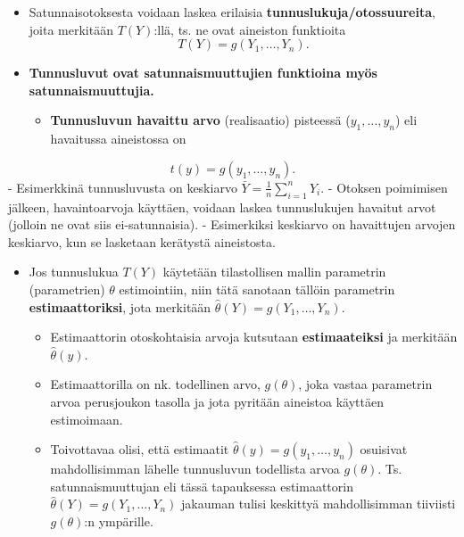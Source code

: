 \documentclass[
]{book}
\providecommand{\tightlist}{%
  \setlength{\itemsep}{0pt}\setlength{\parskip}{0pt}}
\begin{document}
\begin{itemize}
\item
  Satunnaisotoksesta voidaan laskea erilaisia \textbf{tunnuslukuja/otossuureita}, joita merkitään \(T(Y)\):llä, ts. ne ovat aineiston funktioita
  \[
  T(Y) = g(Y_1, \ldots, Y_n).
  \]
\item
  \textbf{Tunnusluvut ovat satunnaismuuttujien funktioina myös satunnaismuuttujia.}

  \begin{itemize}
  \tightlist
  \item
    \textbf{Tunnusluvun havaittu arvo} (realisaatio) pisteessä (\(y_1,\ldots, y_n\)) eli havaitussa aineistossa on
  \end{itemize}
\end{itemize}

\[
t(y) = g(y_1, \ldots, y_n).
\]
- Esimerkkinä tunnusluvusta on keskiarvo \(\bar{Y} = \frac{1}{n} \sum_{i=1}^{n} Y_i\).
- Otoksen poimimisen jälkeen, havaintoarvoja käyttäen, voidaan laskea tunnuslukujen havaitut arvot (jolloin ne ovat siis ei-satunnaisia).
- Esimerkiksi keskiarvo on havaittujen arvojen keskiarvo, kun se lasketaan kerätystä aineistosta.

\begin{itemize}
\tightlist
\item
  Jos tunnuslukua \(T(Y)\) käytetään tilastollisen mallin parametrin (parametrien) \(\theta\) estimointiin, niin tätä sanotaan tällöin parametrin \textbf{estimaattoriksi}, jota merkitään \(\widehat{\theta}(Y) = g(Y_1,\dots,Y_n)\).

  \begin{itemize}
  \tightlist
  \item
    Estimaattorin otoskohtaisia arvoja kutsutaan \textbf{estimaateiksi} ja merkitään \(\widehat{\theta}(y)\).
  \item
    Estimaattorilla on nk. todellinen arvo, \(g(\theta)\), joka vastaa parametrin arvoa perusjoukon tasolla ja jota pyritään aineistoa käyttäen estimoimaan.
  \item
    Toivottavaa olisi, että estimaatit \(\widehat{\theta}(y) = g(y_1, \ldots, y_n)\) osuisivat mahdollisimman lähelle tunnusluvun todellista arvoa \(g(\theta)\). Ts. satunnaismuuttujan eli tässä tapauksessa estimaattorin \(\widehat{\theta}(Y)=g(Y_1, \ldots, Y_n)\) jakauman tulisi keskittyä mahdollisimman tiiviisti \(g(\theta)\):n ympärille.
  \end{itemize}
\end{itemize}
\end{document}
